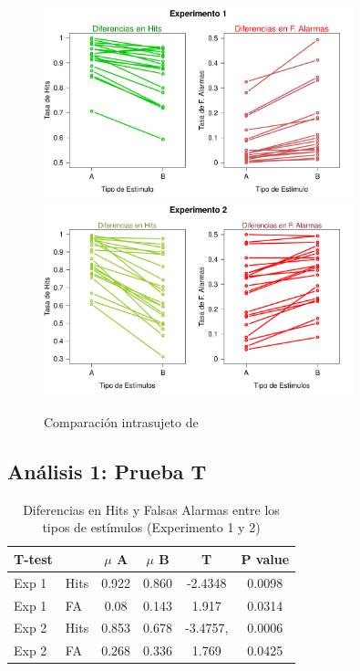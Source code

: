 \begin{figure}[th]
\centering
\includegraphics[width=0.80\textwidth]{Figures/Diff_Rate_E1}\\ 
\includegraphics[width=0.80\textwidth]{Figures/Diff_Rate_E2}
\caption[Diferencias en Tasas (Comprobando diferencias entre condiciones)]{Comparación intrasujeto de}
\label{fig:Diff_Rate}
\end{figure}


\subsection{Análisis 1: Prueba T}



\begin{table}
\caption[Prueba T]{Diferencias en Hits y Falsas Alarmas entre los tipos de estímulos (Experimento 1 y 2)}
\label{Tabla_t-HitsyFA}
\centering
\begin{tabular}{l l | c c c c}
\toprule
\textbf{T-test} & \textbf{} & \textbf{$\mu$ A} & \textbf{$\mu$ B} & \textbf{T} & \textbf{P value}\\
\midrule
Exp 1 & Hits & 0.922 & 0.860 & -2.4348 & 0.0098 \\
Exp 1 & FA & 0.08 & 0.143 & 1.917 & 0.0314 \\
Exp 2 & Hits & 0.853 & 0.678 & -3.4757, & 0.0006 \\
Exp 2 & FA & 0.268 & 0.336 & 1.769 & 0.0425 \\
\bottomrule
\end{tabular}
\end{table}





